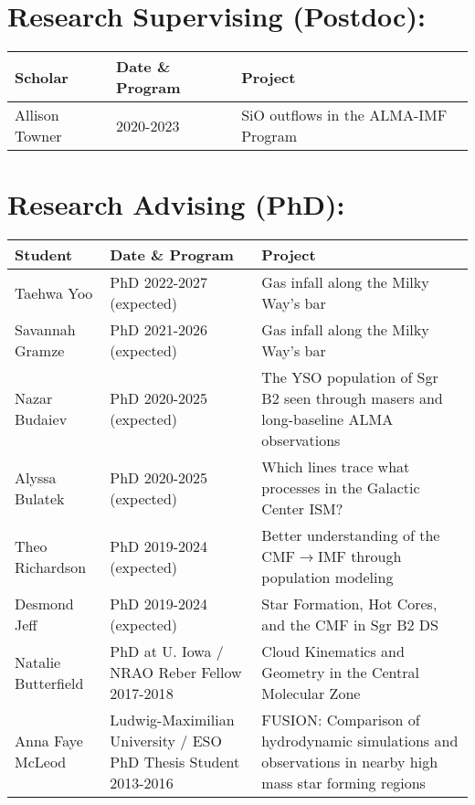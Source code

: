 \begin{minipage}{\textwidth}
\setlength{\extrarowheight}{4pt}
\section*{Research Supervising (Postdoc): }
\vspace{-12pt}
\begin{tabular}{lp{2.1in}p{2.6in}}
    Scholar & Date  \& Program &   Project \\
    \hline
    Allison Towner          &  2020-2023  &                                     SiO outflows in the ALMA-IMF Program \\
\end{tabular}
\end{minipage}


\begin{minipage}{\textwidth}
\setlength{\extrarowheight}{4pt}
\section*{Research Advising (PhD): }
\vspace{-12pt}
\begin{tabular}{lp{2.1in}p{2.6in}}
    Student & Date  \& Program &   Project \\
    \hline
    Taehwa Yoo          &  PhD 2022-2027 (expected) &                                     Gas infall along the Milky Way's bar \\
    Savannah Gramze     &  PhD 2021-2026 (expected) &                                     Gas infall along the Milky Way's bar \\
    Nazar Budaiev       &  PhD 2020-2025 (expected) &                                    The YSO population of Sgr B2 seen through masers and long-baseline ALMA observations  \\
    Alyssa Bulatek      &  PhD 2020-2025 (expected) &                                    Which lines trace what processes in the Galactic Center ISM?  \\
    Theo Richardson     &  PhD 2019-2024 (expected)  &                                   Better understanding of the CMF$\rightarrow$IMF through population modeling  \\
    Desmond Jeff        &  PhD 2019-2024 (expected)  &                                    Star Formation, Hot Cores, and the CMF in Sgr B2 DS \\
    Natalie Butterfield &  PhD at U. Iowa / NRAO Reber Fellow 2017-2018   &                     Cloud Kinematics and Geometry in the Central Molecular Zone \\
    Anna Faye McLeod    &  Ludwig-Maximilian University / ESO PhD Thesis Student 2013-2016  &  FUSION: Comparison of hydrodynamic simulations and observations in nearby high mass star forming regions  \\
\end{tabular}
\end{minipage}


